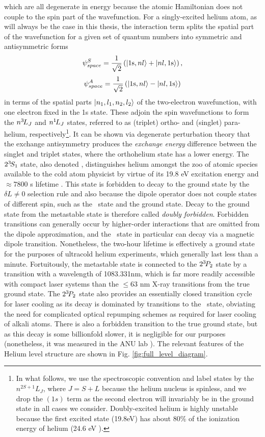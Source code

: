 	\noindent which are all degenerate in energy because the atomic Hamiltonian does not couple to the spin part of the wavefunction.
	For a singly-excited helium atom, as will always be the case in this thesis, the interaction term splits the spatial part of the wavefunction for a given set of quantum numbers into symmetric and antisymmetric forms
	$$
	\psi^{S}_{space} = \frac{1}{\sqrt{2}}\left(|1\textrm{s},nl\rangle +|nl,1\textrm{s}\rangle\right),
	$$
	$$
	\psi^{A}_{space} = \frac{1}{\sqrt{2}}\left(|1\textrm{s},nl\rangle  - |nl,1\textrm{s}\rangle\right)
	$$
	in terms of the spatial parts $|n_1,l_1,n_2,l_2\rangle$ of the two-electron wavefunction, with one electron fixed in the 1s state.
	These adjoin the spin wavefunctions to form the $n^{3\!} L_{J}$ and $n^{1\!} L_{J}$ states, referred to as (triplet) ortho- and (singlet) para-helium, respectively\footnote{In what follows, we use the spectroscopic convention and label states by the $n^{2S+1}L_J$, where $J=S+L$ because the helium nucleus is spinless, and we drop the $(1s)$ term as the second electron will invariably be in the ground state in all cases we consider. Doubly-excited helium is highly unstable because the first excited state (19.8eV) has about 80\% of the ionization energy of helium (24.6 eV \cite{Drake07}).}.
	It can be shown via degenerate perturbation theory that the exchange antisymmetry produces the \emph{exchange energy} difference between the singlet and triplet states, where the  orthohelium state has a lower energy.
	 The $2^{3\!}S_1$ state, also denoted \mhe, distinguishes helium amongst the zoo of atomic species available to the cold atom physicist by virtue of its 19.8 eV excitation energy and $\approx 7800$ s lifetime \cite{Hodgman09_mhe}.
	 This state is forbidden to decay to the ground state by the $\delta L\neq0$ selection rule and also because the dipole operator does not couple states of different spin, such as the \mhe~state and the ground state.
	Decay to the ground state from the metastable state is  therefore called \emph{doubly forbidden}.
	Forbidden transitions can generally occur by higher-order interactions that are omitted from the dipole approximation, and the \mhe~state in particular can decay via a magnetic dipole transition.
	Nonetheless, the two-hour lifetime is effectively a ground state for the purposes of ultracold helium experiments, which generally last less than a minute.
	Fortuitously, the metastable state is connected to the $2^{3\!} P_2$ state by a transition with a wavelength of 1083.331nm, which is far more readily accessible with compact laser systems than the $\leq 63$ nm X-ray transitions from the true ground state.
	The $2^{3\!} P_2$ state also provides an essentially closed transition cycle for laser cooling as its decay is dominated by transitions to the \mhe~state, obviating the need for complicated optical repumping schemes as required for laser cooling of alkali atoms.
	There is also a forbidden transition to the true ground state, but as this decay is some billionfold slower, it is negligible for our purposes (nonetheless, it was measured in the ANU lab \cite{Hodgman09_23P}). The relevant features of the Helium level structure are shown in Fig. \ref{fig:full_level_diagram}.

